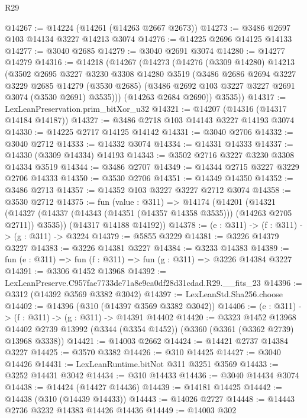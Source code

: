 \begin{lexlean}{R29}
\begin{coremodule}
@14267 := @14224 (@14261 (@14263 @2667 @2673))
@14273 := @3486 @2697 @103 @14134 @3227 @14213 @3074
@14276 := @14225 @2696 @14125 @14133
@14277 := @3040 @2685
@14279 := @3040 @2691 @3074
@14280 := @14277 @14279
@14316 := @14218
    (@14267
      (@14273
        (@14276
          (@3309 @14280)
          @14213
          (@3502
            @2695
            @3227
            @3230
            @3308
            @14280
            @3519
            (@3486
              @2686
              @2694
              @3227
              @3229
              @2685
              @14279
              (@3530 @2685)
              (@3486 @2692 @103 @3227 @3227 @2691 @3074 (@3530 @2691) @3535)))
          (@14263 @2684 @2690))
        @3535))
@14317 := LexLeanPreservation.prim_bitXor_u32
@14321 := @14207 (@14316 (@14317 @14184 @14187))
@14327 := @3486 @2718 @103 @14143 @3227 @14193 @3074
@14330 := @14225 @2717 @14125 @14142
@14331 := @3040 @2706
@14332 := @3040 @2712
@14333 := @14332 @3074
@14334 := @14331 @14333
@14337 := @14330 (@3309 @14334) @14193
@14343 := @3502 @2716 @3227 @3230 @3308 @14334 @3519
@14344 := @3486 @2707
@14349 := @14344 @2715 @3227 @3229 @2706 @14333
@14350 := @3530 @2706
@14351 := @14349 @14350
@14352 := @3486 @2713
@14357 := @14352 @103 @3227 @3227 @2712 @3074
@14358 := @3530 @2712
@14375 := fun (value : @311) =>
  @14174
    (@14201
      (@14321 (@14327 (@14337 (@14343 (@14351 (@14357 @14358 @3535))) (@14263 @2705 @2711)) @3535))
      (@14317 @14188 @14192))
@14378 := (e : @311) -> (f : @311) -> (g : @311) -> @3224
@14379 := @5855 @3229
@14381 := @3226 @14379 @3227
@14383 := @3226 @14381 @3227
@14384 := @3233 @14383
@14389 := fun (e : @311) => fun (f : @311) => fun (g : @311) => @3226 @14384 @3227
@14391 := @3306 @1452 @13968
@14392 := LexLeanPreserve.C957fae7733de71a8e9ca0df28d31cdad.R29.__fits_23
@14396 := @3312 (@14392 @3569 @3382 @3042)
@14397 := LexLeanStd.Sha256.choose
@14402 := @14396 (@310 (@14397 @3569 @3382 @3042))
@14406 := (e : @311) -> (f : @311) -> (g : @311) -> @14391 @14402
@14420 := @3323
    @1452
    @13968
    @14402
    @2739
    @13992
    (@3344 (@3354 @1452))
    (@3360 (@3361 (@3362 @2739) @13968 @3338))
@14421 := @14003 @2662
@14424 := @14421 @2737 @14384 @3227
@14425 := @3570 @3382
@14426 := @310 @14425
@14427 := @3040 @14426
@14431 := LexLeanRuntime.bitNot @311 @3251 @3569
@14433 := @3252 @14431 @3042
@14434 := @310 @14433
@14436 := @3040 @14434 @3074
@14438 := @14424 (@14427 @14436)
@14439 := @14181 @14425
@14442 := @14438 (@310 (@14439 @14433))
@14443 := @14026 @2727
@14448 := @14443 @2736 @3232 @14383 @14426 @14436
@14449 := @14003 @302

\end{coremodule}
\end{lexlean}
